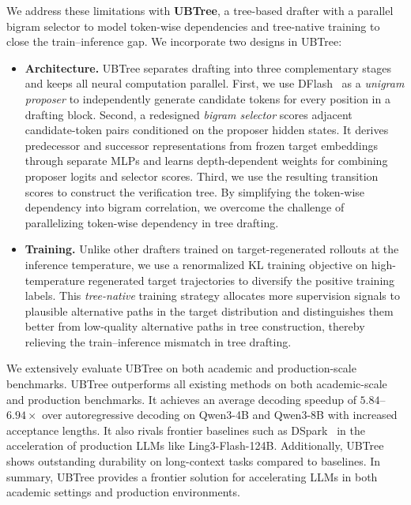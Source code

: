 We address these limitations with \textbf{UBTree}, a tree-based drafter with a parallel bigram selector to model token-wise dependencies and tree-native training to close the train--inference gap. We incorporate two designs in UBTree:
\begin{itemize}
    \item \textbf{Architecture.} UBTree separates drafting into three complementary stages and keeps all neural computation parallel. First, we use DFlash~\citep{chen2026dflash} as a \textit{unigram proposer} to independently generate candidate tokens for every position in a drafting block. Second, a redesigned \textit{bigram selector} scores adjacent candidate-token pairs conditioned on the proposer hidden states. It derives predecessor and successor representations from frozen target embeddings through separate MLPs and learns depth-dependent weights for combining proposer logits and selector scores. Third, we use the resulting transition scores to construct the verification tree. By simplifying the token-wise dependency into bigram correlation, we overcome the challenge of parallelizing token-wise dependency in tree drafting.
    \item \textbf{Training.} Unlike other drafters trained on target-regenerated rollouts at the inference temperature, we use a renormalized KL training objective on high-temperature regenerated target trajectories to diversify the positive training labels. This \textit{tree-native} training strategy allocates more supervision signals to plausible alternative paths in the target distribution and distinguishes them better from low-quality alternative paths in tree construction, thereby relieving the train--inference mismatch in tree drafting.
\end{itemize}
We extensively evaluate UBTree on both academic and production-scale benchmarks. UBTree outperforms all existing methods on both academic-scale and production benchmarks. It achieves an average decoding speedup of $5.84$--$6.94\times$ over autoregressive decoding on Qwen3-4B and Qwen3-8B with increased acceptance lengths. It also rivals frontier baselines such as DSpark~\citep{cheng2026dspark} in the acceleration of production LLMs like Ling3-Flash-124B. Additionally, UBTree shows outstanding durability on long-context tasks compared to baselines. In summary, UBTree provides a frontier solution for accelerating LLMs in both academic settings and production environments.
